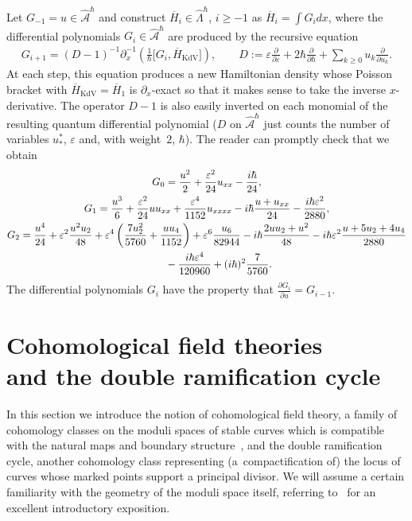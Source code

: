 \documentclass[pdftex]{sigma}
\numberwithin{equation}{section}
\newcommand{\hLambda}{\widehat\Lambda}
\def\d{{\partial}}
\newcommand{\<}{\left<}
\renewcommand{\>}{\right>}
\newcommand{\eps}{\varepsilon}
\newcommand{\hcA}{\widehat{\mathcal A}}
\newcommand{\oH}{{\overline H}}
\begin{document}
Let $G_{-1} = u \in \hcA^{\hbar}$ and construct $\oH_i \in \hLambda^{\hbar}$, $i\geq -1$ as $\oH_i = \int G_i dx$, where the dif\/ferential polynomials $G_i \in \hcA^{\hbar}$ are produced by the recursive equation
\begin{gather*}G_{i+1} = (D-1)^{-1} \d_x^{-1}\left(\frac{1}{\hbar}\big[G_{i} ,\oH_{\mathrm{KdV}}\big]\right), \qquad D:= \eps \frac{\d}{\d \eps} + 2\hbar \frac{\d}{\d \hbar} +\sum_{k\geq 0} u_k \frac{\d}{\d u_k}.\end{gather*}
At each step, this equation produces a new Hamiltonian density whose Poisson bracket with $\oH_{\mathrm{KdV}} = \oH_1$ is $\d_x$-exact so that it makes sense to take the inverse $x$-derivative. The operator $D-1$ is also easily inverted on each monomial of the resulting quantum dif\/ferential polynomial ($D$ on $\hcA^{\hbar}$ just counts the number of variables $u^*_*$, $\eps$ and, with weight~$2$, $\hbar$). The reader can promptly check that we obtain
\begin{gather*}
G_0=\frac{u^2}{2}+\frac{\eps^2}{24}u_{xx}-\frac{i\hbar}{24},\\
G_1=\frac{u^3}{6}+\frac{\eps^2}{24}u u_{xx}+\frac{\eps^4}{1152}u_{xxxx}-i\hbar\frac{u+u_{xx}}{24}-\frac{i\hbar\eps^2}{2880},\\
G_2=\frac{u^4}{24}+\eps^2\frac{u^2 u_2}{48}+\eps^4\left(\frac{7u_2^2}{5760}+\frac{u u_4}{1152}\right)+\eps^6 \frac{u_6}{82944}-i\hbar\frac{2uu_2+u^2}{48}-i\hbar\eps^2\frac{u+5u_2+4u_4}{2880}\\
\hphantom{G_2=}{} -\frac{i\hbar\eps^4}{120960}+(i\hbar)^2\frac{7}{5760}.
\end{gather*}
The dif\/ferential polynomials $G_i$ have the property that $\frac{\d G_{i}}{\d u} = G_{i-1}$.

\section[Cohomological f\/ield theories and the double ramif\/ication cycle]{Cohomological f\/ield theories\\ and the double ramif\/ication cycle}

In this section we introduce the notion of cohomological f\/ield theory, a family of cohomology classes on the moduli spaces of stable curves which is compatible with the natural maps and boundary structure~\cite{KM94}, and the double ramif\/ication cycle, another cohomology class represen\-ting (a~compactif\/ication of) the locus of curves whose marked points support a principal divisor. We will assume a certain familiarity with the geometry of the moduli space itself, referring to~\cite{Zvo06} for an excellent introductory exposition.
\end{document}
